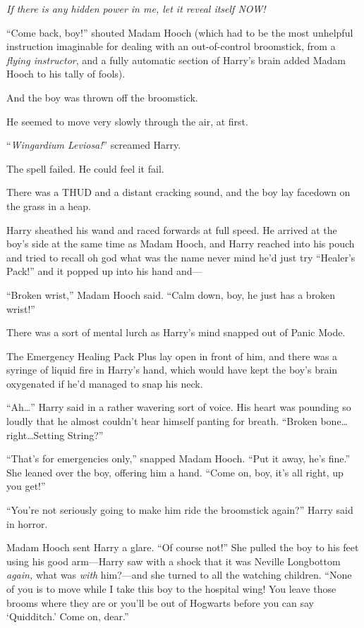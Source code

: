 \emph{If there is any hidden power in me, let it reveal itself NOW!}

“Come back, boy!” shouted Madam Hooch (which had to be the most unhelpful instruction imaginable for dealing with an out-of-control broomstick, from a \emph{flying instructor}, and a fully automatic section of Harry’s brain added Madam Hooch to his tally of fools).

And the boy was thrown off the broomstick.

He seemed to move very slowly through the air, at first.

“\emph{Wingardium Leviosa!}” screamed Harry.

The spell failed. He could feel it fail.

There was a THUD and a distant cracking sound, and the boy lay facedown on the grass in a heap.

Harry sheathed his wand and raced forwards at full speed. He arrived at the boy’s side at the same time as Madam Hooch, and Harry reached into his pouch and tried to recall oh god what was the name never mind he’d just try “Healer’s Pack!” and it popped up into his hand and—

“Broken wrist,” Madam Hooch said. “Calm down, boy, he just has a broken wrist!”

There was a sort of mental lurch as Harry’s mind snapped out of Panic Mode.

The Emergency Healing Pack Plus lay open in front of him, and there was a syringe of liquid fire in Harry’s hand, which would have kept the boy’s brain oxygenated if he’d managed to snap his neck.

“Ah…” Harry said in a rather wavering sort of voice. His heart was pounding so loudly that he almost couldn’t hear himself panting for breath. “Broken bone…right…Setting String?”

“That’s for emergencies only,” snapped Madam Hooch. “Put it away, he’s fine.” She leaned over the boy, offering him a hand. “Come on, boy, it’s all right, up you get!”

“You’re not seriously going to make him ride the broomstick again?” Harry said in horror.

Madam Hooch sent Harry a glare. “Of course not!” She pulled the boy to his feet using his good arm—Harry saw with a shock that it was Neville Longbottom \emph{again,} what was \emph{with} him?—and she turned to all the watching children. “None of you is to move while I take this boy to the hospital wing! You leave those brooms where they are or you’ll be out of Hogwarts before you can say ‘Quidditch.’ Come on, dear.”

